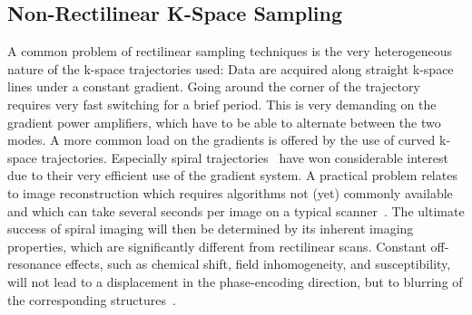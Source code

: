 \documentclass[english,version-2022-01]{uzl-thesis} %
\begin{document}
\subsection{Non-Rectilinear K-Space Sampling}
A common problem of rectilinear sampling techniques is the very heterogeneous nature of the k-space trajectories used: Data are acquired along straight k-space lines under a constant gradient. Going around the corner of the trajectory requires very fast switching for a brief period. 
This 
is very demanding on the gradient power amplifiers, which have to be able to alternate between the two modes. A more common load on the gradients is offered by the use of curved k-space trajectories. Especially spiral trajectories~\cite{SpiralMRI, SpiralMRI2} have won considerable interest due to their very efficient use of the gradient system. 
A practical problem relates to image reconstruction which requires algorithms not (yet) commonly available and which can take several seconds per image on a typical scanner~\cite{SamplingStrategies}. 
The ultimate success of spiral imaging will then be determined by its inherent imaging properties, which are significantly different from rectilinear scans. Constant off-resonance effects, such as chemical shift, field inhomogeneity, and susceptibility, will not lead to a displacement in the phase-encoding direction, but to blurring of the corresponding structures~\cite{SamplingStrategies}.
\end{document}
